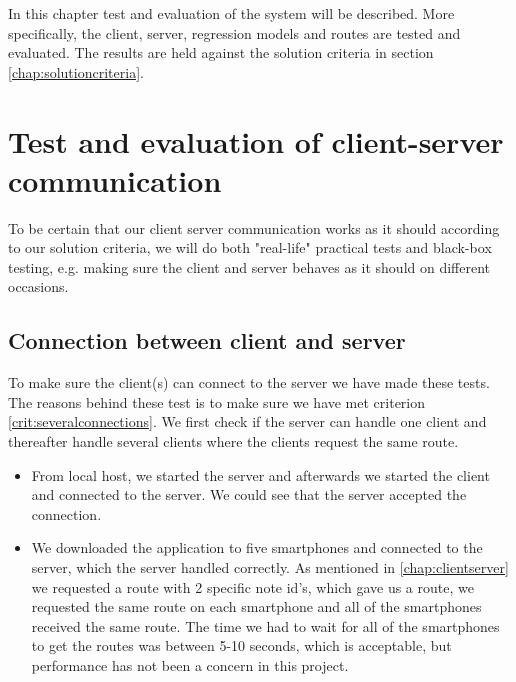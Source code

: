 In this chapter test and evaluation of the system will be described. More specifically, the client, server, regression models and routes are tested and evaluated. The results are held against the solution criteria in section \ref{chap:solutioncriteria}.

\section{Test and evaluation of client-server communication}
To be certain that our client server communication works as it should according to our solution criteria, we will do both "real-life" practical tests and black-box testing, e.g. making sure the client and server behaves as it should on different occasions.

\subsection{Connection between client and server}
To make sure the client(s) can connect to the server we have made these tests. The reasons behind these test is to make sure we have met criterion \ref{crit:severalconnections}. We first check if the server can handle one client and thereafter handle several clients where the clients request the same route. 
\begin{itemize}
	\item From local host, we started the server and afterwards we started the client and connected to the server. We could see that the server accepted the connection.
	\item We downloaded the application to five smartphones and connected to the server, which the server handled correctly. As mentioned in \autoref{chap:clientserver} we requested a route with 2 specific note id's, which gave us a route, we requested the same route on each smartphone and all of the smartphones received the same route. The time we had to wait for all of the smartphones to get the routes was between 5-10 seconds, which is acceptable, but performance has not been a concern in this project.
\end{itemize}

